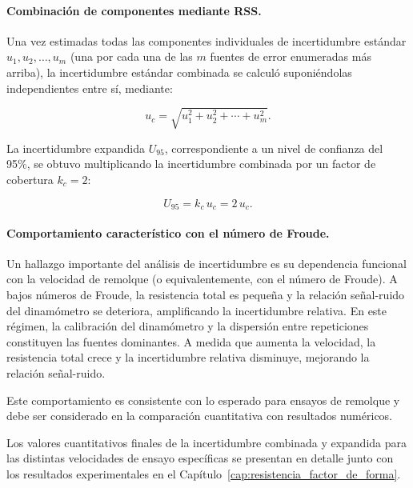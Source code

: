 \paragraph{Combinación de componentes mediante RSS.}

Una vez estimadas todas las componentes individuales de incertidumbre estándar $u_1, u_2, \dots, u_m$ (una por cada una de las $m$ fuentes de error enumeradas más arriba), la incertidumbre estándar combinada se calculó suponiéndolas independientes entre sí, mediante:

\begin{equation}
u_c = \sqrt{u_1^2 + u_2^2 + \cdots + u_m^2}.
\end{equation}

La incertidumbre expandida $U_{95}$, correspondiente a un nivel de confianza del 95\%, se obtuvo multiplicando la incertidumbre combinada por un factor de cobertura $k_c = 2$:

\begin{equation}
U_{95} = k_c\, u_c = 2\,u_c .
\end{equation}

\paragraph{Comportamiento característico con el número de Froude.}

Un hallazgo importante del análisis de incertidumbre es su dependencia funcional con la velocidad de remolque (o equivalentemente, con el número de Froude). A bajos números de Froude, la resistencia total es pequeña y la relación señal-ruido del dinamómetro se deteriora, amplificando la incertidumbre relativa. En este régimen, la calibración del dinamómetro y la dispersión entre repeticiones constituyen las fuentes dominantes. A medida que aumenta la velocidad, la resistencia total crece y la incertidumbre relativa disminuye, mejorando la relación señal-ruido.

Este comportamiento es consistente con lo esperado para ensayos de remolque y debe ser considerado en la comparación cuantitativa con resultados numéricos.

Los valores cuantitativos finales de la incertidumbre combinada y expandida para las distintas velocidades de ensayo específicas se presentan en detalle junto con los resultados experimentales en el Capítulo~\ref{cap:resistencia_factor_de_forma}.

